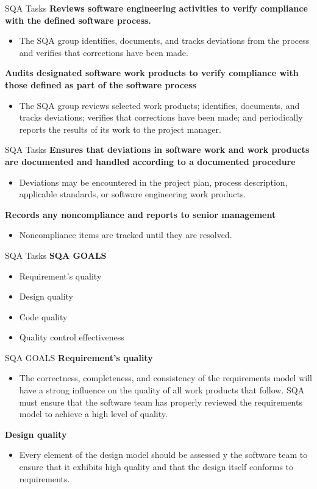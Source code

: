 \documentclass{beamer}
\begin{document}
\begin{frame}{SQA Tasks}
	\textbf{Reviews software engineering activities to verify compliance with the defined software process. }
	\begin{itemize}
		\item The SQA group identifies, documents, and tracks deviations from the process and verifies that corrections have been made.	
	\end{itemize}
	\textbf{Audits designated software work products to verify compliance with those defined as part of the software process}
	\begin{itemize}
		\item The SQA group reviews selected work products; identifies, documents, and tracks deviations; verifies that corrections have been made; and periodically reports the results of its work to the project manager.
	\end{itemize}

\end{frame}
\begin{frame}{SQA Tasks}
	\textbf{Ensures that deviations in software work and work products are documented and handled according to a documented procedure}
	\begin{itemize}
		\item Deviations may be encountered in the project plan, process description, applicable standards, or software engineering work products. 
	\end{itemize}
	\textbf{Records any noncompliance and reports to senior management}
	\begin{itemize}
		\item Noncompliance items are tracked until they are resolved.
	\end{itemize}
\end{frame}
\begin{frame}{SQA Tasks}
	\textbf{SQA GOALS }
	\begin{itemize}
		\item Requirement’s quality
		\item Design quality
		\item Code quality
		\item Quality control effectiveness
	\end{itemize}
\end{frame}
\begin{frame}{SQA GOALS}
	\textbf{Requirement’s quality}
	\begin{itemize}
		\item The correctness, completeness, and consistency of the requirements model will have a strong influence on the quality of all work products that follow. SQA must ensure that the software team has properly reviewed the requirements model to achieve a high level of quality.
	\end{itemize}
\textbf{Design quality}
\begin{itemize}
	\item Every element of the design model should be assessed y the software team to ensure that it exhibits high quality and that the design itself conforms to requirements.
\end{itemize}

\end{frame}
\end{document}
